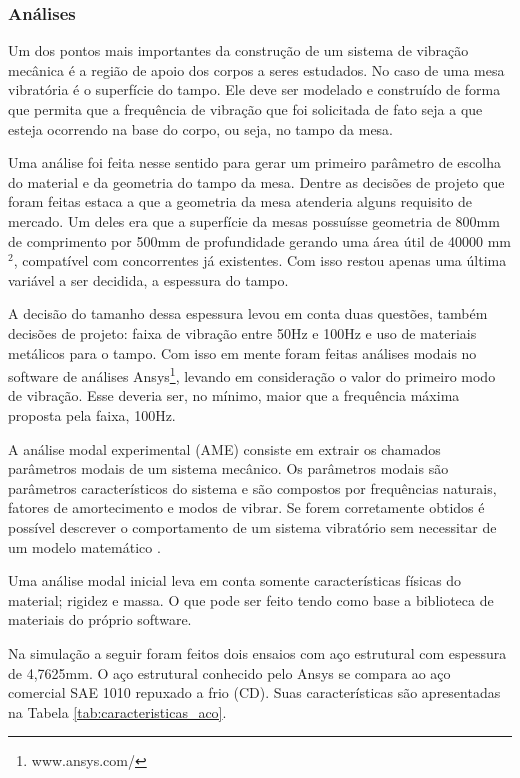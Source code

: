\subsubsection*{\textbf{Análises}}

    Um dos pontos mais importantes da construção de um sistema de vibração mecânica é a região de apoio dos corpos a seres estudados. No caso de uma mesa vibratória é o superfície do tampo. Ele deve ser modelado e construído de forma que permita que a frequência de vibração que foi solicitada de fato seja a que esteja ocorrendo na base do corpo, ou seja, no tampo da mesa.

    Uma análise foi feita nesse sentido para gerar um primeiro parâmetro de escolha do material e da geometria do tampo da mesa. Dentre as decisões de projeto que foram feitas estaca a que a geometria da mesa atenderia alguns requisito de mercado. Um deles era que a superfície da mesas possuísse geometria de 800mm de comprimento por 500mm de profundidade gerando uma área útil de 40000 mm$^2$, compatível com concorrentes já existentes. Com isso restou apenas uma última variável a ser decidida, a espessura do tampo.

    A decisão do tamanho dessa espessura levou em conta duas questões, também decisões de projeto: faixa de vibração entre 50Hz e 100Hz e uso de materiais metálicos para o tampo. Com isso em mente foram feitas análises modais no software de análises Ansys\footnote{www.ansys.com/}, levando em consideração o valor do primeiro modo de vibração. Esse deveria ser, no mínimo, maior que a frequência máxima proposta pela faixa, 100Hz.

    A análise modal experimental (AME) consiste em extrair os chamados parâmetros modais de um sistema mecânico. Os parâmetros modais são parâmetros característicos do sistema e são compostos por frequências naturais, fatores de amortecimento e modos de vibrar. Se forem corretamente obtidos é possível descrever o comportamento de um sistema vibratório sem necessitar de um modelo matemático \cite{evandro}.

    Uma análise modal inicial leva em conta somente características físicas do material; rigidez e massa. O que pode ser feito tendo como base a biblioteca de materiais do próprio software.

    Na simulação a seguir foram feitos dois ensaios com aço estrutural com espessura de 4,7625mm. O aço estrutural conhecido pelo Ansys se compara ao aço comercial SAE 1010 repuxado a frio (CD). Suas características são apresentadas na Tabela \ref{tab:caracteristicas_aco}.

